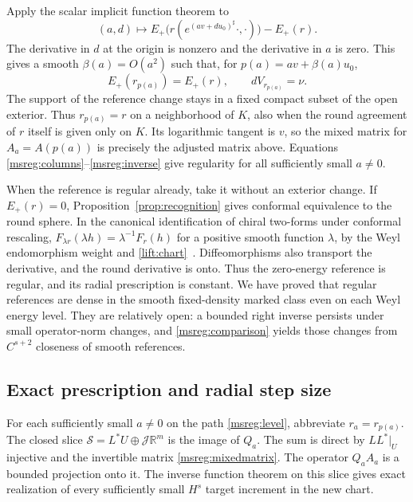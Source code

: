 \documentclass[11pt]{article}
\numberwithin{equation}{section}
\theoremstyle{definition}
\theoremstyle{remark}
\begin{document}
Apply the scalar implicit function theorem to
\[
 (a,d)\longmapsto
 E_+\bigl(r(e^{(av+d u_0)^\sharp}\cdot,\cdot)\bigr)-E_+(r).
\]
The derivative in \(d\) at the origin is nonzero and the
derivative in \(a\) is zero. This gives a smooth \(\beta(a)=O(a^2)\)
such that, for \(p(a)=av+\beta(a)u_0\),
\begin{equation}
 E_+(r_{p(a)})=E_+(r),\qquad dV_{r_{p(a)}}=\nu .
 \label{msreg:level}
\end{equation}
The support of the reference change stays in a fixed compact
subset of the open exterior. Thus \(r_{p(a)}=r\) on a neighborhood
of \(K\), also when the round agreement of \(r\) itself is given
only on \(K\). Its logarithmic tangent is \(v\), so the mixed
matrix for \(A_a=A(p(a))\) is precisely the adjusted matrix
above. Equations \eqref{msreg:columns}--\eqref{msreg:inverse}
give regularity for all sufficiently small \(a\ne0\).

When the reference is regular already, take it without an
exterior change. If \(E_+(r)=0\), Proposition~\ref{prop:recognition}
gives conformal equivalence to the round sphere. In the canonical
identification of chiral two-forms under conformal rescaling,
\(F_{\lambda r}(\lambda h)=\lambda^{-1}F_r(h)\) for a positive
smooth function \(\lambda\), by the Weyl endomorphism weight
and \eqref{lift:chart}~\cite[discussion after (6.7)]{FeffermanGraham2008Ambient}.
Diffeomorphisms also transport the derivative, and the round
derivative is onto. Thus the zero-energy reference is regular,
and its radial prescription is constant. We have proved that
regular references are dense in the smooth fixed-density marked
class even on each Weyl energy level. They are relatively open:
a bounded right inverse persists under small operator-norm
changes, and \eqref{msreg:comparison} yields those changes from
\(C^{s+2}\) closeness of smooth references.

\subsection{Exact prescription and radial step size}

For each sufficiently small \(a\ne0\) on the path
\eqref{msreg:level}, abbreviate \(r_a=r_{p(a)}\).
The closed slice
\(\mathcal S=L^*U\oplus\mathcal J\mathbb R^m\) is the image of
\(Q_a\). The sum is direct by \(LL^*|_U\) injective and the
invertible matrix \eqref{msreg:mixedmatrix}. The operator \(Q_a A_a\)
is a bounded projection onto it. The inverse function theorem
on this slice gives exact realization of every sufficiently
small \(H^s\) target increment in the new chart.
\end{document}
